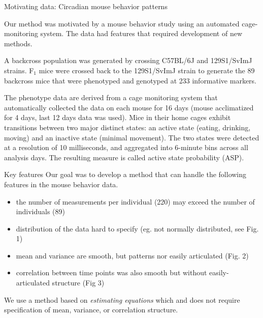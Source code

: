 \documentclass[final,plain]{beamer}
\newlength{\onecolwid}
\begin{document}
\begin{frame}[t]
\begin{columns}[t]
\begin{column}{\onecolwid}
    \begin{block}{Motivating data: Circadian mouse behavior patterns}

      Our method was motivated by a mouse behavior study using an
      automated cage-monitoring system.  The data had features that 
      required development of new methods.

      A backcross population was generated by crossing C57BL/6J and
      129S1/SvImJ strains. F$_1$ mice were crossed back to the
      129S1/SvImJ strain to generate the 89 backcross mice that were
      phenotyped and genotyped at 233 informative markers.
      
      The phenotype data are derived from a cage monitoring system
      that automatically collected the data on each mouse for 16 days
      (mouse acclimatized for 4 days, last 12 days data was
      used). Mice in their home cages exhibit transitions between two
      major distinct states: an active state (eating, drinking,
      moving) and an inactive state (minimal movement).  The two
      states were detected at a resolution of 10 milliseconds, and
      aggregated into 6-minute bins across all analysis days.  The
      resulting measure is called active state probability (ASP).

    \end{block}


    \begin{block}{Key features}
      Our goal was to develop a method that can handle the following
      features in the mouse behavior data.
      \begin{itemize}
      \item the number of measurements per individual (220) may exceed the
        number of individuals (89)
      \item distribution of the data hard to specify (eg. not normally
        distributed, see Fig. 1)
      \item mean and variance are smooth, but patterns nor easily
        articulated (Fig. 2)
      \item correlation between time points was also smooth but without
        easily-articulated structure (Fig 3)
      \end{itemize}
      
      We use a method based on {\em estimating equations} which and does not
      require specification of mean, variance, or correlation structure.
      
    \end{block}


\end{column}
\end{columns}
\end{frame}
\end{document}
